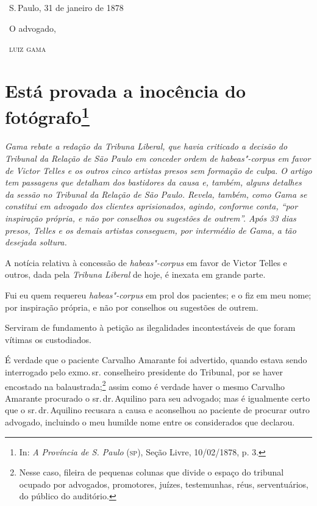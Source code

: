 \bigskip

\hfill\ S.\,Paulo, 31 de janeiro de 1878\smallskip

\hfill\ O advogado, 

\hfill\ \textsc{luiz gama}

\chapter{Está provada a inocência do fotógrafo\footnote[*]{In: \emph{A Província de S.
  Paulo} (\textsc{sp}), Seção Livre, 10/02/1878, p. 3.}}

\begin{flushleft}
{\footnotesize\itshape
Gama rebate a redação da Tribuna
Liberal, que havia criticado a decisão do Tribunal da Relação de São
Paulo em conceder ordem de \emph{habeas"-corpus} em favor de Victor
Telles e os outros cinco artistas presos sem formação de culpa. O artigo
tem passagens que detalham dos bastidores da causa e, também, alguns
detalhes da sessão no Tribunal da Relação de São Paulo. Revela, também,
como Gama se constitui em advogado dos clientes aprisionados, agindo,
conforme conta, ``por inspiração própria, e não por conselhos ou
sugestões de outrem''. Após 33 dias presos, Telles e os demais artistas
conseguem, por intermédio de Gama, a tão desejada soltura. }
\end{flushleft}

\noindent{}A notícia relativa à concessão de \emph{habeas"-corpus} em favor de
Victor Telles e outros, dada pela \emph{Tribuna Liberal} de hoje, é
inexata em grande parte.

Fui eu quem requereu \emph{habeas"-corpus} em prol dos pacientes; e o fiz
em meu nome; por inspiração própria, e não por conselhos ou sugestões de
outrem.

Serviram de fundamento à petição as ilegalidades incontestáveis de que
foram vítimas os custodiados.

É verdade que o paciente Carvalho Amarante foi advertido, quando estava
sendo interrogado pelo exmo.\,sr. conselheiro presidente do Tribunal, por
se haver encostado na balaustrada;\footnote{Nesse caso, fileira de
  pequenas colunas que divide o espaço do tribunal ocupado por
  advogados, promotores, juízes, testemunhas, réus, serventuários, do
  público do auditório.} assim como é verdade haver o mesmo Carvalho
Amarante procurado o sr.\,dr.\,Aquilino para seu advogado; mas é
igualmente certo que o sr.\,dr.\,Aquilino recusara a causa e aconselhou ao
paciente de procurar outro advogado, incluindo o meu humilde nome entre
os considerados que declarou.

